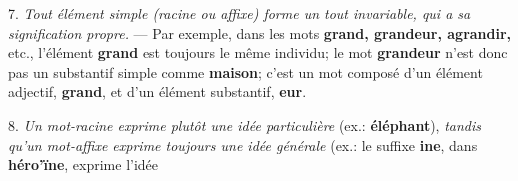 {  7. 
  \emph{Tout élément simple (racine ou affixe) forme un tout
    invariable, qui a sa signification propre.} — Par exemple, dans
  les mots \textsf{\textbf{grand, grandeur, agrandir,}} etc.,
  l’élément \textsf{\textbf{grand}} est toujours le même individu; le
  mot \textsf{\textbf{grandeur}} n’est donc pas un substantif simple
  comme \textsf{\textbf{maison}}; c’est un mot composé d’un élément
  adjectif, \textsf{\textbf{grand}}, et d’un élément substantif,
  \textsf{\textbf{eur}}.

  8. \emph{Un mot-racine exprime plutôt une idée particulière} (ex.:
  \textsf{\textbf{éléphant}}), \emph{tandis qu’un mot-affixe exprime
    toujours une idée générale} (ex.: le suffixe
  \textsf{\textbf{ine}}, dans \textsf{\textbf{héro'ïne}}, exprime
  l’idée}

